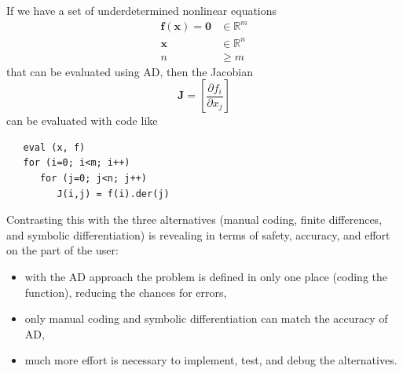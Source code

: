 \documentclass[10pt,openany,twoside]{book}
\numberwithin{equation}{section}   %
\newcommand{\Matrix}[1]{\boldsymbol{#1}}
\newcommand{\Vector}[1]{\boldsymbol{#1}}
\begin{document}
If we have a set of underdetermined nonlinear equations
\begin{align}
\Vector{f}(\Vector{x}) = \Vector{0} & \in \mathbb{R}^{m} \nonumber \\
\Vector{x} & \in \mathbb{R}^{n} \nonumber \\
n & \ge m	\nonumber
\end{align}
that can be evaluated using AD, then the Jacobian
\begin{displaymath}
\Matrix{J} = \left[ \frac{\partial f_i}{\partial x_j} \right]
\end{displaymath}
can be evaluated with code like
\begin{lstlisting}
   eval (x, f)
   for (i=0; i<m; i++)
      for (j=0; j<n; j++)
         J(i,j) = f(i).der(j)
\end{lstlisting}
Contrasting this with the three alternatives (manual coding, finite
differences, and symbolic differentiation) is revealing in terms of
safety, accuracy, and effort on the part of the user:
\begin{itemize}
	\item with the AD approach the problem is defined in only one place (coding
		the function), reducing the chances for errors,
	\item only manual coding and symbolic differentiation can match the accuracy
		of AD,
	\item much more effort is necessary to implement, test, and debug the
		alternatives.
\end{itemize}

\end{document}
